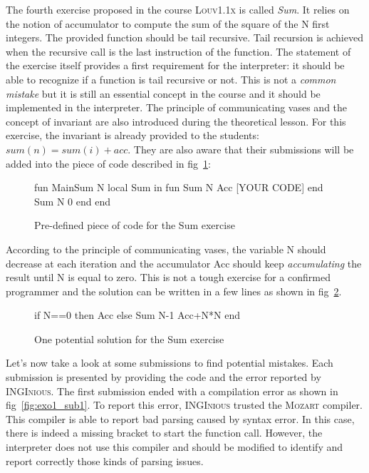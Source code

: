 \documentclass[11pt,a4paper,twoside,openright]{report}
\begin{document}
The fourth exercise proposed in the course \textsc{Louv1.1x} is called 
\textit{Sum}. It relies on the notion of accumulator to compute the sum of the 
square of the N first integers. The provided function should be tail recursive. 
Tail recursion is achieved when the recursive call is the last instruction of 
the function. The statement of the exercise itself provides a first requirement 
for the interpreter: it should be able to recognize if a function is tail 
recursive or not. This is not a \textit{common mistake} but it is still an 
essential concept in the course and it should be implemented in the 
interpreter. The principle of communicating vases and the concept of invariant 
are also introduced during the theoretical lesson. For this exercise, the 
invariant is already provided to the students: $sum(n) = sum(i) + acc$. They 
are also aware that their submissions will be added into the piece of code described 
in fig~\ref{fig:exo1_statement}:

\begin{figure}[!ht]
  \begin{OZ}
    fun {MainSum N}
      local Sum in
        fun {Sum N Acc}
          [YOUR CODE]
        end
        {Sum N 0}
      end
    end
  \end{OZ}
  \caption{Pre-defined piece of code for the Sum exercise}
  \label{fig:exo1_statement}
\end{figure}

According to the principle of communicating vases, the variable N should 
decrease at each iteration and the accumulator Acc should keep 
\textit{accumulating} the result until N is equal to zero. This is not a tough 
exercise for a confirmed programmer and the solution can be written in a few 
lines as shown in fig~\ref{fig:exo1_code}.\\

\begin{figure}[!ht]
  \begin{OZ}
    if N==0 then Acc
    else {Sum N-1 Acc+N*N}
    end
  \end{OZ}
  \caption{One potential solution for the Sum exercise}
  \label{fig:exo1_code}
\end{figure}

Let's now take a look at some submissions to find potential mistakes. Each 
submission is presented by providing the code and the error reported by 
\textsc{INGInious}. The first submission ended with a compilation error as 
shown in fig~\ref{fig:exo1_sub1}. To report this error, \textsc{INGInious} 
trusted the \textsc{Mozart} compiler. This compiler is able to report bad 
parsing caused by syntax error. In this case, there is indeed a missing bracket 
to start the function call. However, the interpreter does not use this compiler 
and should be modified to identify and report correctly those kinds of parsing 
issues.
  \begin{OZ}
    if N==0 then Acc
    else Sum N-1 Acc+N*N}
    end
  \end{OZ} 
  
\end{document}
